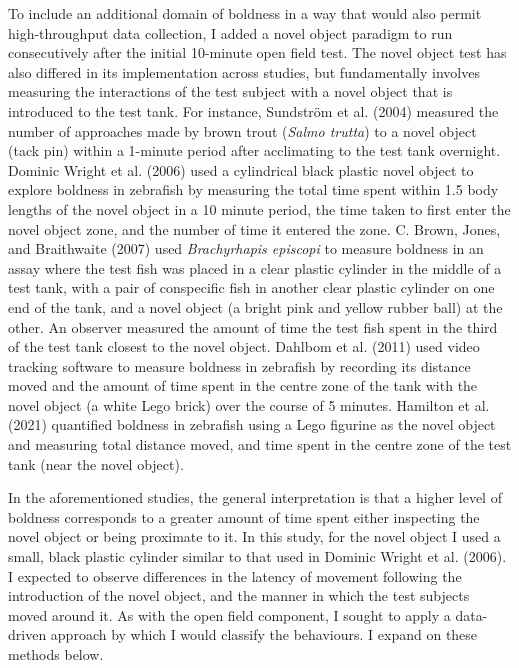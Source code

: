 \documentclass[
]{book}
\begin{document}
To include an additional domain of boldness in a way that would also permit high-throughput data collection, I added a novel object paradigm to run consecutively after the initial 10-minute open field test. The novel object test has also differed in its implementation across studies, but fundamentally involves measuring the interactions of the test subject with a novel object that is introduced to the test tank. For instance, Sundström et al. (2004) measured the number of approaches made by brown trout (\emph{Salmo trutta}) to a novel object (tack pin) within a 1-minute period after acclimating to the test tank overnight. Dominic Wright et al. (2006) used a cylindrical black plastic novel object to explore boldness in zebrafish by measuring the total time spent within 1.5 body lengths of the novel object in a 10 minute period, the time taken to first enter the novel object zone, and the number of time it entered the zone. C. Brown, Jones, and Braithwaite (2007) used \emph{Brachyrhapis episcopi} to measure boldness in an assay where the test fish was placed in a clear plastic cylinder in the middle of a test tank, with a pair of conspecific fish in another clear plastic cylinder on one end of the tank, and a novel object (a bright pink and yellow rubber ball) at the other. An observer measured the amount of time the test fish spent in the third of the test tank closest to the novel object. Dahlbom et al. (2011) used video tracking software to measure boldness in zebrafish by recording its distance moved and the amount of time spent in the centre zone of the tank with the novel object (a white Lego brick) over the course of 5 minutes. Hamilton et al. (2021) quantified boldness in zebrafish using a Lego figurine as the novel object and measuring total distance moved, and time spent in the centre zone of the test tank (near the novel object).

In the aforementioned studies, the general interpretation is that a higher level of boldness corresponds to a greater amount of time spent either inspecting the novel object or being proximate to it. In this study, for the novel object I used a small, black plastic cylinder similar to that used in Dominic Wright et al. (2006). I expected to observe differences in the latency of movement following the introduction of the novel object, and the manner in which the test subjects moved around it. As with the open field component, I sought to apply a data-driven approach by which I would classify the behaviours. I expand on these methods below.
\end{document}
